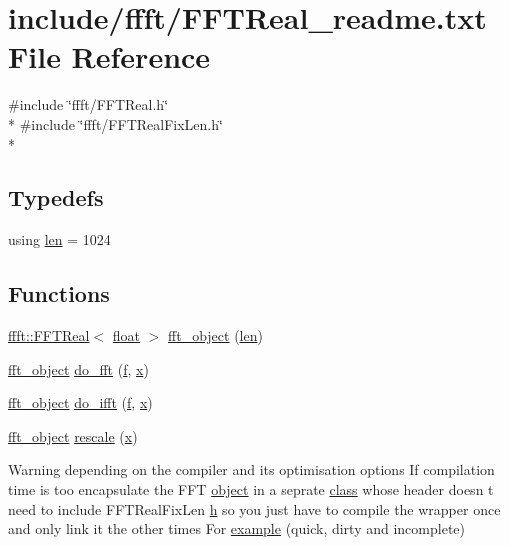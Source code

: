 \hypertarget{FFTReal__readme_8txt}{}\section{include/ffft/\+F\+F\+T\+Real\+\_\+readme.txt File Reference}
\label{FFTReal__readme_8txt}
{\ttfamily \#include \char`\"{}ffft/\+F\+F\+T\+Real.\+h\char`\"{}}\\*
{\ttfamily \#include \char`\"{}ffft/\+F\+F\+T\+Real\+Fix\+Len.\+h\char`\"{}}\\*
\subsection*{Typedefs}
\begin{DoxyCompactItemize}
\item 
using \hyperlink{FFTReal__readme_8txt_a555609f588a3dd8483e643133ba24b82}{len} = 1024
\end{DoxyCompactItemize}
\subsection*{Functions}
\begin{DoxyCompactItemize}
\item 
\hyperlink{classffft_1_1FFTReal}{ffft\+::\+F\+F\+T\+Real}$<$ \hyperlink{FFTReal__readme_8txt_a0ea2fae2a8106200bf378b90eae003cf}{float} $>$ \hyperlink{FFTReal__readme_8txt_a38b2d99092edb3ec444550a95aa1951f}{fft\+\_\+object} (\hyperlink{FFTReal__readme_8txt_a555609f588a3dd8483e643133ba24b82}{len})
\item 
\hyperlink{FFTReal__readme_8txt_a38b2d99092edb3ec444550a95aa1951f}{fft\+\_\+object} \hyperlink{FFTReal__readme_8txt_a601296d1e380b29c96683b649d7d1518}{do\+\_\+fft} (\hyperlink{FFTReal__readme_8txt_abbf3cc73d1e3e4714ab1639819396eca}{f}, \hyperlink{FFTReal__readme_8txt_a9c92ac89d1560f812393ca39a19e581e}{x})
\item 
\hyperlink{FFTReal__readme_8txt_a38b2d99092edb3ec444550a95aa1951f}{fft\+\_\+object} \hyperlink{FFTReal__readme_8txt_a1a33a3b7245f269d5150c436da7d5ed6}{do\+\_\+ifft} (\hyperlink{FFTReal__readme_8txt_abbf3cc73d1e3e4714ab1639819396eca}{f}, \hyperlink{FFTReal__readme_8txt_a9c92ac89d1560f812393ca39a19e581e}{x})
\item 
\hyperlink{FFTReal__readme_8txt_a38b2d99092edb3ec444550a95aa1951f}{fft\+\_\+object} \hyperlink{FFTReal__readme_8txt_ab87096300f2c26c87aa35b0623fdfd1e}{rescale} (\hyperlink{FFTReal__readme_8txt_a9c92ac89d1560f812393ca39a19e581e}{x})
\item 
Warning depending on the compiler and its optimisation options If compilation time is too encapsulate the F\+FT \hyperlink{FFTReal__readme_8txt_a5057f8d0a8b36ba2bdea206a5592c87a}{object} in a seprate \hyperlink{FFTReal__readme_8txt_ad229ab5c8241df85a2096743cc8c4e9f}{class} whose header doesn t need to include F\+F\+T\+Real\+Fix\+Len \hyperlink{FFTReal__readme_8txt_a5a475fe9e77e2d776b063abc32a10e20}{h} so you just have to compile the wrapper once and only link it the other times For \hyperlink{FFTReal__readme_8txt_a22165307fc7fb8edc069828217b871ec}{example} (quick, dirty and incomplete)
\end{DoxyCompactItemize}
